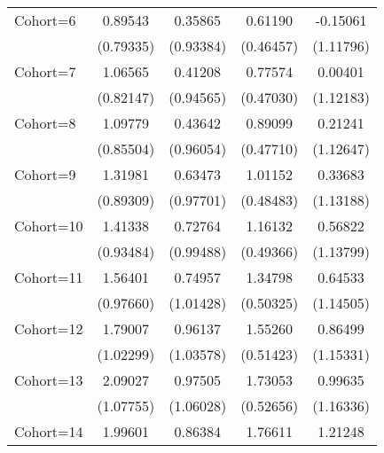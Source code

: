 \begin{table}[htbp]
\begin{tabular}{l*{4}{c}}
\addlinespace
Cohort=6            &     0.89543         &     0.35865         &     0.61190         &    -0.15061         \\
                    &   (0.79335)         &   (0.93384)         &   (0.46457)         &   (1.11796)         \\
\addlinespace
Cohort=7            &     1.06565         &     0.41208         &     0.77574\sym{*}  &     0.00401         \\
                    &   (0.82147)         &   (0.94565)         &   (0.47030)         &   (1.12183)         \\
\addlinespace
Cohort=8            &     1.09779         &     0.43642         &     0.89099\sym{*}  &     0.21241         \\
                    &   (0.85504)         &   (0.96054)         &   (0.47710)         &   (1.12647)         \\
\addlinespace
Cohort=9            &     1.31981         &     0.63473         &     1.01152\sym{**} &     0.33683         \\
                    &   (0.89309)         &   (0.97701)         &   (0.48483)         &   (1.13188)         \\
\addlinespace
Cohort=10           &     1.41338         &     0.72764         &     1.16132\sym{**} &     0.56822         \\
                    &   (0.93484)         &   (0.99488)         &   (0.49366)         &   (1.13799)         \\
\addlinespace
Cohort=11           &     1.56401         &     0.74957         &     1.34798\sym{***}&     0.64533         \\
                    &   (0.97660)         &   (1.01428)         &   (0.50325)         &   (1.14505)         \\
\addlinespace
Cohort=12           &     1.79007\sym{*}  &     0.96137         &     1.55260\sym{***}&     0.86499         \\
                    &   (1.02299)         &   (1.03578)         &   (0.51423)         &   (1.15331)         \\
\addlinespace
Cohort=13           &     2.09027\sym{*}  &     0.97505         &     1.73053\sym{***}&     0.99635         \\
                    &   (1.07755)         &   (1.06028)         &   (0.52656)         &   (1.16336)         \\
\addlinespace
Cohort=14           &     1.99601         &     0.86384         &     1.76611\sym{***}&     1.21248         \\

\end{tabular}
\end{table}
